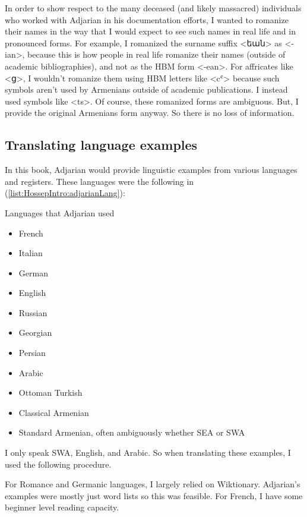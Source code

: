 In order  to show respect to the many deceased (and likely massacred) individuals who worked with Adjarian in his documentation efforts, I wanted to romanize their names in the way that I would expect to see such names in real life and in pronounced forms.  For example, I romanized the surname suffix <եան> as <-ian>, because this is how people in real life romanize their names (outside of academic bibliographies), and not as the HBM form <-ean>. For affricates like <ց>, I wouldn't romanize them using HBM letters like <cʿ> because such symbols aren't used by Armenians outside of academic publications. I instead used symbols like <ts>. Of course, these romanized forms are ambiguous. But, I provide the original Armenians form anyway. So there is no loss of information.






\subsection{Translating language examples}\label{sec:HossepIntro:translation:lang}

In this book, Adjarian would provide linguistic examples from various languages and registers. These languages were the following in (\ref{list:HossepIntro:adjarianLang}):  

\begin{exe}
	\ex Languages that Adjarian used \label{list:HossepIntro:adjarianLang}
	\begin{itemize}
		 \item French
\item Italian
\item German
\item English
		 \item Russian
		 \item Georgian
		 \item Persian
\item Arabic
		 \item Ottoman Turkish
		 \item Classical Armenian
		 \item Standard Armenian, often ambiguously whether SEA or SWA
		\end{itemize}
\end{exe}

I only speak SWA, English, and Arabic. So when translating these examples, I used the following procedure. 

For Romance and Germanic languages, I largely relied on Wiktionary. Adjarian's examples were mostly just word lists so this was feasible. For French, I have some beginner level reading capacity. 

